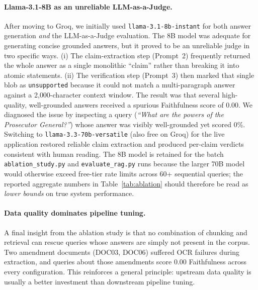 \documentclass[11pt,a4paper]{article}
\begin{document}
\paragraph{Llama-3.1-8B as an unreliable LLM-as-a-Judge.}
After moving to Groq, we initially used \texttt{llama-3.1-8b-instant} for both answer generation \emph{and} the LLM-as-a-Judge evaluation. The 8B model was adequate for generating concise grounded answers, but it proved to be an unreliable judge in two specific ways. (i) The claim-extraction step (Prompt~2) frequently returned the whole answer as a single monolithic ``claim'' rather than breaking it into atomic statements. (ii) The verification step (Prompt~3) then marked that single blob as \texttt{unsupported} because it could not match a multi-paragraph answer against a 2{,}000-character context window. The result was that several high-quality, well-grounded answers received a spurious Faithfulness score of 0.00. We diagnosed the issue by inspecting a query (\emph{``What are the powers of the Prosecutor General?''}) whose answer was visibly well-grounded yet scored 0\%. Switching to \texttt{llama-3.3-70b-versatile} (also free on Groq) for the live application restored reliable claim extraction and produced per-claim verdicts consistent with human reading. The 8B model is retained for the batch \texttt{ablation\_study.py} and \texttt{evaluate\_rag.py} runs because the larger 70B model would otherwise exceed free-tier rate limits across 60+ sequential queries; the reported aggregate numbers in Table~\ref{tab:ablation} should therefore be read as \emph{lower bounds} on true system performance.

\paragraph{Data quality dominates pipeline tuning.}
A final insight from the ablation study is that no combination of chunking and retrieval can rescue queries whose answers are simply not present in the corpus. Two amendment documents (DOC03, DOC06) suffered OCR failures during extraction, and queries about those amendments score 0.00 Faithfulness across every configuration. This reinforces a general principle: upstream data quality is usually a better investment than downstream pipeline tuning.
\end{document}
